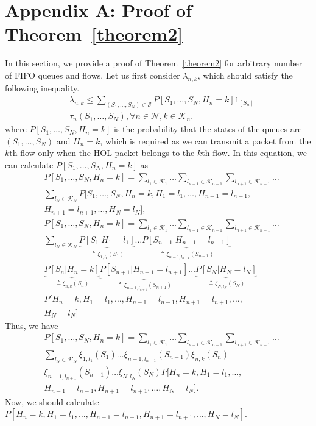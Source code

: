 \documentclass[conference]{IEEEtran}
\newcommand{\Sset}{\mathcal{S}}
\newcommand{\Kset}{\mathcal{K}}
\newcommand{\Nset}{\mathcal{N}}
\begin{document}
\section*{Appendix A: Proof of Theorem~\ref{theorem2}}
In this section, we provide a proof of Theorem~\ref{theorem2} for arbitrary number of FIFO queues and flows. 
Let us first consider $\lambda_{n,k}$, which should satisfy the following inequality. 
\begin{align} \label{eq:appA_1}
& \lambda_{n,k} \leq \sum_{(S_1,\ldots,S_N) \in \Sset} P[S_1,\ldots,S_N, H_n=k] 1_{[S_n]} \nonumber \\
& \tau_{n}(S_1,\ldots,S_N),  \forall n \in \Nset, k \in \Kset_{n}.
\end{align} where $P[S_1,\ldots,S_N, H_n=k]$ is the probability that the states of the queues are $(S_1,\ldots,S_N)$ and $H_n=k$, which is required as we can transmit a packet from the $k$th flow only when the HOL packet belongs to the $k$th flow. 
In this equation, we can calculate $P[S_1,\ldots,S_N, H_n=k]$ as 
\begin{align}
& P[S_1,\ldots,S_N, H_n=k]  = \sum_{l_1 \in \Kset_{1}} \ldots \sum_{l_{n-1} \in \Kset_{n-1}} \sum_{l_{n+1} \in \Kset_{n+1}} \ldots \nonumber \\
& \sum_{l_N \in \Kset_{N}} P[S_{1}, \ldots, S_{N}, H_{n}=k, H_1=l_1, \ldots, H_{n-1}=l_{n-1}, \nonumber \\
& H_{n+1}=l_{n+1}, \ldots, H_{N}=l_{N} ],
\end{align} 
\begin{align}
& P[S_1,\ldots,S_N, H_n=k]  = \sum_{l_1 \in \Kset_{1}} \ldots \sum_{l_{n-1} \in \Kset_{n-1}} \sum_{l_{n+1} \in \Kset_{n+1}} \ldots \nonumber \\
& \sum_{l_N \in \Kset_{N}} \underbrace{P[S_1 | H_1=l_1]}_{\triangleq \xi_{1,l_1}(S_1)} \ldots \underbrace{P[S_{n-1} | H_{n-1}=l_{n-1}]}_{\triangleq \xi_{n-1,l_{n-1}}(S_{n-1})} \nonumber \\
& \underbrace{P[S_{n} | H_{n}=k]}_{\triangleq \xi_{n,k}(S_{n})}  \underbrace{P[S_{n+1} | H_{n+1} = l_{n+1}]}_{\triangleq \xi_{n+1,l_{n+1}}(S_{n+1})} \ldots \underbrace{P[S_{N} | H_{N} = l_{N}]}_{\triangleq \xi_{N,l_{N}}(S_{N})} 
\nonumber \\
& P[H_{n}=k,  H_{1}=l_{1}, \ldots, H_{n-1}=l_{n-1}, H_{n+1}=l_{n+1}, \ldots, \nonumber \\
& H_{N}=l_{N}]
\end{align} Thus, we have
\begin{align} \label{eq:states_v1}
& P[S_1,\ldots,S_N, H_n=k]  = \sum_{l_1 \in \Kset_{1}} \ldots \sum_{l_{n-1} \in \Kset_{n-1}} \sum_{l_{n+1} \in \Kset_{n+1}} \ldots \nonumber \\
& \sum_{l_N \in \Kset_{N}} {\xi_{1,l_1}(S_1)} \ldots {\xi_{n-1,l_{n-1}}(S_{n-1})} {\xi_{n,k}(S_{n})} \nonumber \\
& {\xi_{n+1,l_{n+1}}(S_{n+1})}  \ldots {\xi_{N,l_{N}}(S_{N})} 
 P[H_{n}=k,  H_{1}=l_{1}, \ldots, \nonumber \\
& H_{n-1}=l_{n-1},   H_{n+1}=l_{n+1}, \ldots,  H_{N}=l_{N}]. 
\end{align} Now, we should calculate $P[H_{n}=k,  H_{1}=l_{1}, \ldots, H_{n-1}=l_{n-1}, H_{n+1}=l_{n+1}, \ldots,  H_{N}=l_{N}]$. 
\end{document}
